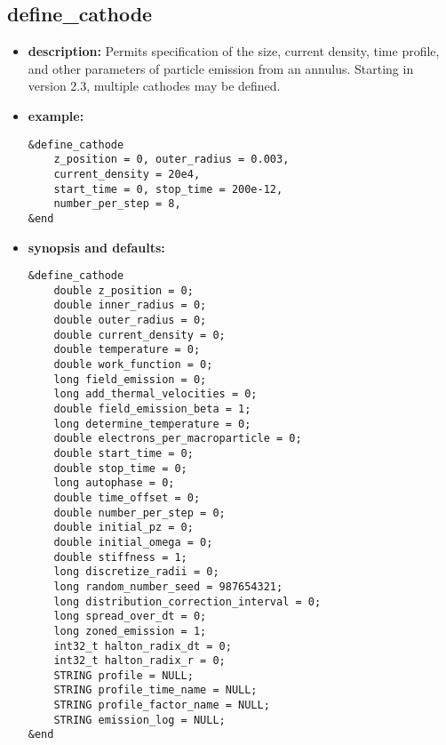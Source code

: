 %
\newpage

\subsection{define\_cathode}

\begin{itemize}

\item {\bf description:}
Permits specification of the size, current density, time profile, and
other parameters of particle emission from an annulus.  Starting in 
version 2.3, multiple cathodes may be defined.

\item {\bf example:} 
\begin{verbatim}
&define_cathode
    z_position = 0, outer_radius = 0.003,
    current_density = 20e4, 
    start_time = 0, stop_time = 200e-12,
    number_per_step = 8, 
&end
\end{verbatim}

\item {\bf synopsis and defaults:} 
\begin{verbatim}
&define_cathode
    double z_position = 0;
    double inner_radius = 0;
    double outer_radius = 0;
    double current_density = 0;
    double temperature = 0;
    double work_function = 0;
    long field_emission = 0;
    long add_thermal_velocities = 0;
    double field_emission_beta = 1;
    long determine_temperature = 0;
    double electrons_per_macroparticle = 0;
    double start_time = 0;
    double stop_time = 0;
    long autophase = 0;
    double time_offset = 0;
    double number_per_step = 0;
    double initial_pz = 0;
    double initial_omega = 0;
    double stiffness = 1;
    long discretize_radii = 0;
    long random_number_seed = 987654321;
    long distribution_correction_interval = 0;
    long spread_over_dt = 0;
    long zoned_emission = 1;
    int32_t halton_radix_dt = 0;
    int32_t halton_radix_r = 0;
    STRING profile = NULL;
    STRING profile_time_name = NULL;
    STRING profile_factor_name = NULL;
    STRING emission_log = NULL;
&end
\end{verbatim}


\end{itemize}
